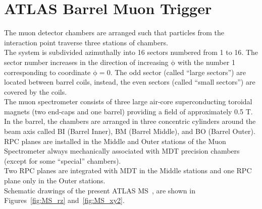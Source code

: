 \section{ATLAS Barrel Muon Trigger}
The muon detector chambers are arranged such that particles from the interaction point traverse three stations of chambers.\\
The system is subdivided azimuthally into 16 sectors numbered from 1 to 16.
The sector number increases in the direction of increasing $\mathrm{\phi}$ with the number 1 corresponding to coordinate $\mathrm{\phi=0}$. The odd sector (called “large sectors”)
are located between barrel coils, instead, the even sectors (called “small sectors”) are covered by the coils.\\
The muon spectrometer consists of three large air-core superconducting toroidal magnets (two end-caps and one barrel) providing a field of approximately 0.5 T.\\
In the barrel, the chambers are arranged in three concentric cylinders around the beam axis called BI (Barrel Inner), BM (Barrel Middle), and BO (Barrel Outer). \\
RPC planes are installed in the Middle
and Outer stations of the Muon Spectrometer always mechanically associated with MDT precision chambers (except for some “special” chambers). \\
Two RPC planes are integrated with MDT in the Middle stations and one RPC plane only in the Outer stations.\\
Schematic drawings of the present ATLAS MS~\cite{TDR}, are shown in Figures~\ref{fig:MS_rz} and~\ref{fig:MS_xy2}.
